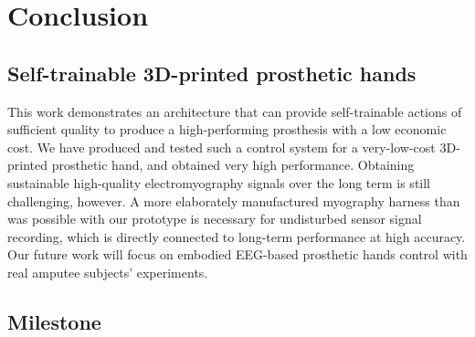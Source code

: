 \chapter{Conclusion}

\section{Self-trainable 3D-printed prosthetic hands}
This work demonstrates an architecture that can provide self-trainable
actions of sufficient quality to produce a high-performing prosthesis
with a low economic cost. We have produced and tested such a control
system for a very-low-cost 3D-printed prosthetic hand, and obtained
very high performance.  Obtaining sustainable high-quality
electromyography signals over the long term is still challenging,
however.  A more elaborately manufactured myography harness than was
possible with our prototype is necessary for undisturbed sensor signal
recording, which is directly connected to long-term performance at
high accuracy. Our future work will focus on embodied EEG-based prosthetic hands control with real amputee subjects' experiments.

\section{Milestone}

